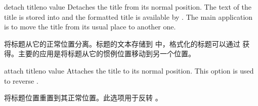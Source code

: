 \begin{docTcbKey}{detach title}{}{no value}
Detaches the title from its normal position. The text of the title is
stored into  and the formatted title is
available by .
The main application is to move the title from its usual place to another one.
  
将标题从它的正常位置分离。标题的文本存储到  中，格式化的标题可以通过  获得。主要的应用是将标题从它的惯例位置移动到另一个位置。

  
  \end{docTcbKey}
  

  

\begin{docTcbKey}{attach title}{}{no value}
  Attaches the title to its normal position. This option is used to reverse
  .

  将标题位置重置到其正常位置。此选项用于反转 。
  \end{docTcbKey}
  
